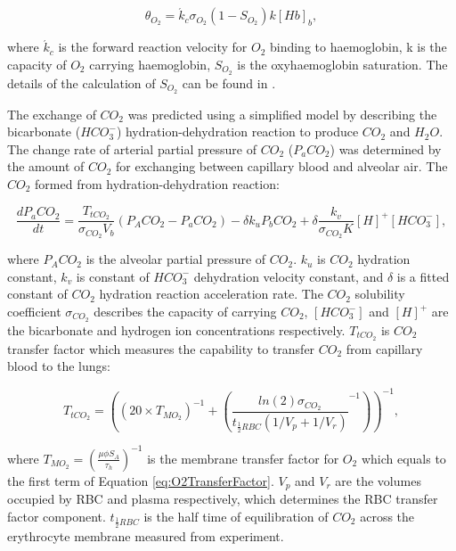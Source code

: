 \begin{equation} 
 \label{eq:OxygenUptakeRate}
 \theta_{O_2} = \acute{k}_c \sigma_{O_2}(1 - S_{O_2})k[Hb]_b,
\end{equation}

\noindent where $\acute{k}_c$ is the forward reaction velocity for $O_2$ binding to haemoglobin, k is the capacity of $O_2$ carrying haemoglobin, $S_{O_2}$ is the oxyhaemoglobin saturation. The details of the calculation of $S_{O_2}$ can be found in \cite{swan2010evidence, swan2010multi}.

The exchange of $CO_2$ was predicted using a simplified model by describing the bicarbonate ($HCO^{-}_3$) hydration-dehydration reaction to produce $CO_2$ and $H_2 O$. The change rate of arterial partial pressure of $CO_2$ ($P_a CO_2$) was determined by the amount of $CO_2$ for exchanging between capillary blood and alveolar air. The $CO_2$ formed from hydration-dehydration reaction:

\begin{equation} 
 \label{eq:CO2ExchangeEquation}
 \frac{dP_a CO_2}{dt} = \frac{T_{tCO_2}}{\sigma_{CO_2}V_b}(P_A CO_2 - P_a CO_2) - \delta k_u P_b CO_2 + \delta \frac{k_v}{\sigma_{CO_2}K}[H]^{+}[HCO^{-}_3],
\end{equation}

\noindent where $P_A CO_2$ is the alveolar partial pressure of $CO_2$. $k_u$ is $CO_2$ hydration constant, $k_v$ is constant of $HCO^{-}_3$ dehydration velocity constant, and $\delta$ is a fitted constant of $CO_2$ hydration reaction acceleration rate. The $CO_2$ solubility coefficient $\sigma_{CO_2}$ describes the capacity of carrying $CO_2$, $[HCO^{-}_3]$ and $[H]^{+}$ are the bicarbonate and hydrogen ion concentrations respectively. $T_{tCO_2}$ is $CO_2$ transfer factor which measures the capability to transfer $CO_2$ from capillary blood to the lungs:

\begin{equation} 
 \label{eq:CO2TransferFactor}
 T_{tCO_2} = ((20 \times T_{MO_2})^{-1} + ({\frac{ln(2)\sigma_{CO_2}}{t_{\frac{1}{2}RBC}(1/V_p + 1/V_r)}}^{-1}))^{-1},
\end{equation}

\noindent where $T_{MO_2} = (\frac{\mu\phi S_A}{\tau_h})^{-1}$ is the membrane transfer factor for $O_2$ which equals to the first term of Equation \ref{eq:O2TransferFactor}. $V_p$ and $V_r$ are the volumes occupied by RBC and plasma respectively, which determines the RBC transfer factor component. $t_{\frac{1}{2}RBC}$ is the half time of equilibration of $CO_2$ across the erythrocyte membrane measured from experiment.

